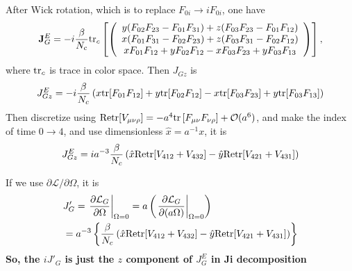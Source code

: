After Wick rotation, which is to replace $F_{0i}\to iF_{0i}$, one have
\begin{equation}
\begin{split}
&{\bf J}^E_G=-i\frac{\beta}{N_c}{\rm tr}_c\left[\left(\begin{array}{c}
y(F_{02}F_{23}-F_{01}F_{31})+z(F_{03}F_{23}-F_{01}F_{12})\\
x(F_{01}F_{31}-F_{02}F_{23})+z(F_{03}F_{31}-F_{02}F_{12})\\
x F_{01}F_{12}+yF_{02}F_{12}-xF_{03}F_{23}+yF_{03}F_{13} \end{array}\right)\right],\\
\end{split}
\end{equation}
where ${\rm tr}_c$ is trace in color space. Then $J_{Gz}$ is
\begin{equation}
\begin{split}
&J^E_{Gz}=-i\frac{\beta}{N_c}\left(x {\rm tr}[F_{01}F_{12}]+y{\rm tr}[F_{02}F_{12}]-x{\rm tr}[F_{03}F_{23}]+y{\rm tr}[F_{03}F_{13}]\right)\\
\end{split}
\end{equation}
Then discretize using ${\rm Retr}[V_{\mu\nu\rho}]=-a^4{\rm tr}\left[F_{\mu\nu}F_{\nu\rho}\right]+\mathcal{O}(a^6)$, and make the index of time $0\to 4$, and use dimensionless $\hat{x}=a^{-1}x$, it is\textcolor[rgb]{0,0,1}{
\begin{equation}
\begin{split}
&J^E_{Gz}=ia^{-3}\frac{\beta}{N_c}\left(\hat{x} {\rm Retr}[V_{412}+V_{432}]-\hat{y}{\rm Retr}[V_{421}+V_{431}]\right)\\
\end{split}
\end{equation}
}

If we use $\partial \mathcal{L}/\partial \Omega $, it is
\begin{equation}
\begin{split}
&J'_{G}=\left.\frac{\partial\mathcal{L}_G}{\partial\Omega}\right|_{\Omega=0}=a\left(\left.\frac{\partial\mathcal{L}_G}{\partial(a\Omega)}\right|_{\Omega=0}\right)\\
&=a^{-3}\left\{\frac{\beta}{N_c}\left(\hat{x} {\rm Retr}[V_{412}+V_{432}]-\hat{y}{\rm Retr}[V_{421}+V_{431}]\right)\right\}\\
\end{split}
\end{equation}
\textbf{So, the $iJ'_G$ is just the $z$ component of $J_G^E$ in Ji decomposition~\cite{AngularMomentum}}

